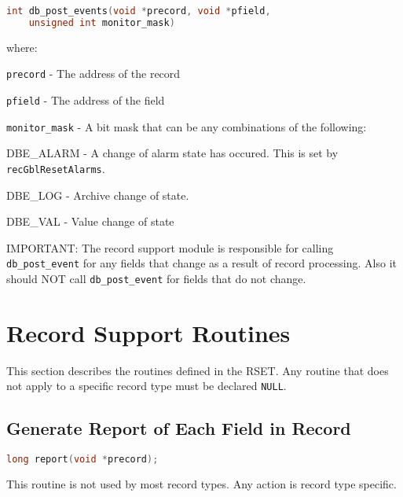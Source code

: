 \begin{lstlisting}[language=C]
int db_post_events(void *precord, void *pfield,
    unsigned int monitor_mask)
\end{lstlisting}
where:
\begin{description}
\item \verb|precord| - The address of the record

\item \verb|pfield| - The address of the field

\item \verb|monitor_mask| - A bit mask that can be any combinations of the following:


\begin{description}

\item {}DBE\_ALARM - A change of alarm state has occured.
This is set by \verb|recGblResetAlarms|.

\item {}DBE\_LOG - Archive change of state.

\item {}DBE\_VAL - Value change of state

\end{description}

\end{description}
IMPORTANT:
The record support module is responsible for calling \verb|db_post_event| for any fields that change as a result of record processing.
Also it should NOT call \verb|db_post_event| for fields that do not change.

\section{Record Support Routines}

This section describes the routines defined in the RSET.
Any routine that does not apply to a specific record type must be declared \verb|NULL|.

\subsection{Generate Report of Each Field in Record}

\begin{lstlisting}[language=C]
long report(void *precord);
\end{lstlisting}

This routine is not used by most record types.
Any action is record type specific.

